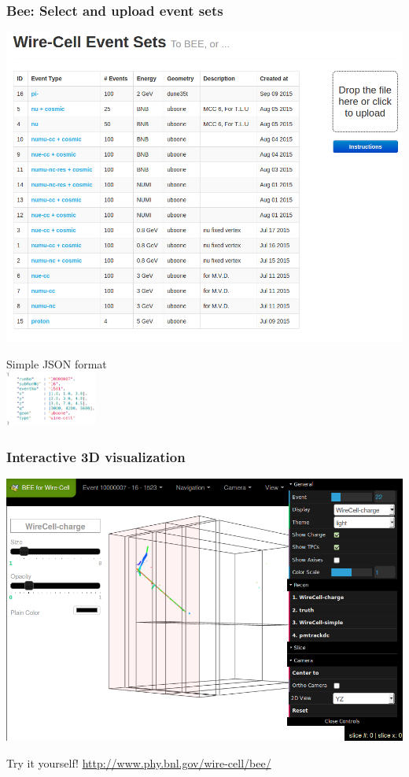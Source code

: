 \documentclass[xcolor=dvipsnames]{beamer}
\begin{document}
\begin{frame}[fragile]
  \frametitle{Bee: Select and upload event sets}
  \begin{center}
    \includegraphics[height=0.8\textheight]{bee-event-sets-page.png}

    \vspace{-3cm}
    \flushright \footnotesize Simple JSON format\\
    \includegraphics[width=3cm]{json-data.png}
  \end{center}
\end{frame}

\begin{frame}
  \frametitle{Interactive 3D visualization}
  \begin{center}
    \includegraphics[height=0.7\textheight]{bee-full-gui.png}    
  \end{center}
  \begin{center}
    Try it yourself! \url{http://www.phy.bnl.gov/wire-cell/bee/}
  \end{center}
\end{frame}
\end{document}

